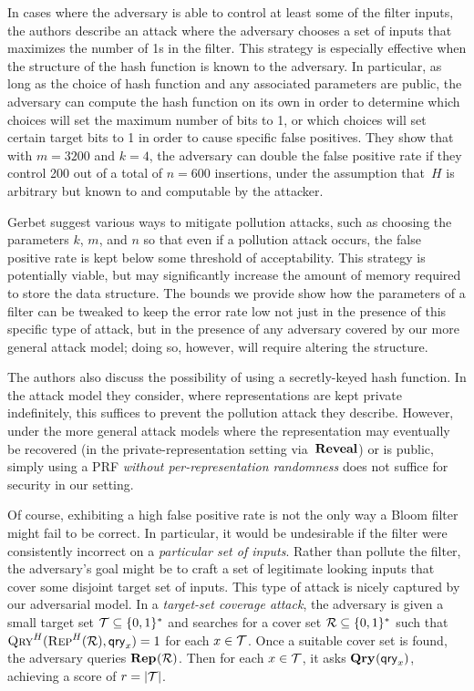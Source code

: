 In cases where the adversary is able to control at least some of the filter inputs,
the authors describe an attack where the adversary chooses a set of
inputs that maximizes the number of 1s in the filter. This strategy is especially
effective when the structure of the hash function is known to the adversary. In
particular, as long as the choice of hash function and any associated parameters
are public, the adversary can compute the hash function on its own in order to
determine which choices will set the maximum number of bits to 1, or which
choices will set certain target bits to 1 in order to cause specific false
positives. They show that with $m = 3200$ and $k = 4$, the adversary can double
the false positive rate if they control 200 out of a total of $n = 600$
insertions, under the assumption that~$H$ is arbitrary but known to and
computable by the attacker.

Gerbet \etal suggest various ways to mitigate pollution attacks, such as choosing
the parameters $k$, $m$, and $n$ so that even if a pollution attack
occurs, the false positive rate is kept below some threshold of acceptability.
This strategy is  potentially viable, but may significantly increase the amount
of memory required to store the data structure.  The bounds we provide show how
the parameters of a filter can be tweaked to keep the error rate low not just in
the presence of this specific type of attack, but in the presence of any
adversary covered by our more general attack model; doing so, however, will
require altering the structure.

The authors also discuss the possibility of using a secretly-keyed
hash function. In the attack model they consider, where representations are kept
private indefinitely, this suffices to prevent the pollution attack they
describe. However, under the more general attack models where the representation
may eventually be recovered (in the private-representation setting via~$\mathbf{Reveal}$)
or is public, simply using a PRF \emph{without per-representation randomness}
does not suffice for security in our setting.

%
Of course, exhibiting a high false positive rate is not the only way a Bloom
filter might fail to be correct. In particular, it would be undesirable if the
filter were consistently incorrect on a \emph{particular set of inputs}. Rather
than pollute the filter, the adversary's goal might be to craft a set of
legitimate looking inputs that cover some disjoint target set of inputs.
%
This type of attack is nicely captured by our adversarial model.
%
In a \emph{target-set coverage attack}, the adversary is given a small target set
$\mathcal{T}\subseteq\{0,1\}^*$ and searches for a cover set $\mathcal{R}\subseteq\{0,1\}^*$
such that $\textnormal{\textsc{Qry}}^H(\textnormal{\textsc{Rep}}^H(\mathcal{R}),\mathsf{qry}_x)=1$ for each $x\in\mathcal{T}$.
%
Once a suitable cover set is found, the adversary queries $\textup{\textbf{Rep}}\hspace{0.5pt}(\mathcal{R})$. Then
for each $x\in\mathcal{T}$, it asks $\textup{\textbf{Qry}}\hspace{0.5pt}(\mathsf{qry}_x)$, achieving a score of $r = |\mathcal{T}|$.

